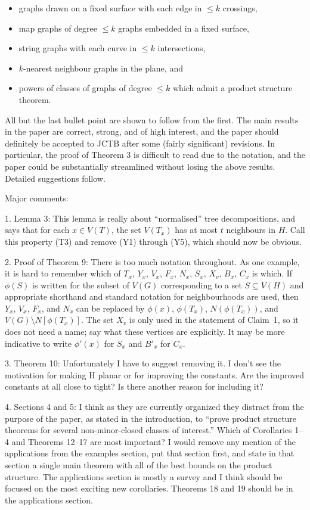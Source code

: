 \documentclass[12pt]{article}
\begin{document}
\begin{itemize}
\item graphs drawn on a fixed surface with each edge in $\leq k$ crossings,
\item map graphs of degree $\leq k$ graphs embedded in a fixed surface,
\item string graphs with each curve in $\leq k$ intersections,
\item $k$-nearest neighbour graphs in the plane, and
\item powers of classes of graphs of degree $\leq k$ which admit a product structure theorem.
\end{itemize}

All but the last bullet point are shown to follow from the first.
The main results in the paper are correct, strong, and of high interest,
and the paper should definitely be accepted to JCTB after some
(fairly significant) revisions. In particular, the proof of Theorem 3 is
difficult to read due to the notation, and the paper could be substantially
streamlined without losing the above results. Detailed suggestions follow.

Major comments:

1. Lemma 3: This lemma is really about “normalised” tree decompositions, and says that for each $x \in V(T)$, the set $V(T_x)$ has at most $t$ neighbours in $H$. Call this property (T3) and remove (Y1)  through (Y5), which should now be obvious.

2. Proof of Theorem 9: There is too much notation throughout. As
one example, it is hard to remember which of $T_x$, $Y_x$, $V_x$, $F_x$, $N_x$,
$S_x$, $X_v$, $B_x$, $C_x$ is which. If $\phi(S)$ is written for the subset of $V(G)$
corresponding to a set $S \subseteq V(H)$ and appropriate shorthand and
standard notation for neighbourhoods are used, then $Y_x$, $V_x$, $F_x$, and
$N_x$ can be replaced by $\phi(x)$, $\phi(T_x)$, $N(\phi(T_x))$, and $V(G) \setminus N[\phi(T_x)]$.
The set $X_v$ is only used in the statement of Claim~1, so it does not
need a name; say what these vertices are explicitly. It may be more
indicative to write $\phi'(x)$ for $S_x$ and $B'_x$ for $C_x$.

3. Theorem 10: Unfortunately I have to suggest removing it. I don’t see
the motivation for making H planar or for improving the constants.
Are the improved constants at all close to tight? Is there another
reason for including it?

4. Sections 4 and 5: I think as they are currently organized they distract from the purpose of the paper, as stated in the introduction, to
“prove product structure theorems for several non-minor-closed classes
of interest.” Which of Corollaries 1–4 and Theorems 12–17 are most
important? I would remove any mention of the applications from the
examples section, put that section first, and state in that section a single main theorem with all of the best bounds on the product structure.
The applications section is mostly a survey and I think should be
focused on the most exciting new corollaries. Theorems 18 and 19
should be in the applications section.
\end{document}
